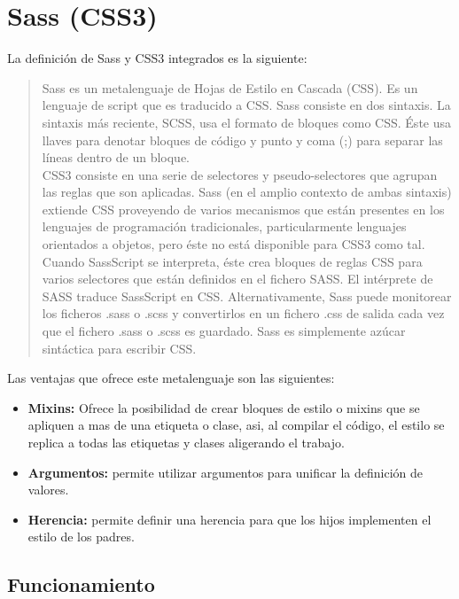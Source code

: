 
\section{Sass (CSS3)}
La definición de Sass y CSS3 integrados es la siguiente:

\begin{quote}
	Sass es un metalenguaje de Hojas de Estilo en Cascada (CSS). Es un lenguaje de script que es traducido a CSS. Sass consiste en dos sintaxis. La sintaxis más reciente, SCSS, usa el formato de bloques como CSS. Éste usa llaves para denotar bloques de código y punto y coma (;) para separar las líneas dentro de un bloque.\\
	
	CSS3 consiste en una serie de selectores y pseudo-selectores que agrupan las reglas que son aplicadas. Sass (en el amplio contexto de ambas sintaxis) extiende CSS proveyendo de varios mecanismos que están presentes en los lenguajes de programación tradicionales, particularmente lenguajes orientados a objetos, pero éste no está disponible para CSS3 como tal. Cuando SassScript se interpreta, éste crea bloques de reglas CSS para varios selectores que están definidos en el fichero SASS. El intérprete de SASS traduce SassScript en CSS. Alternativamente, Sass puede monitorear los ficheros .sass o .scss y convertirlos en un fichero .css de salida cada vez que el fichero .sass o .scss es guardado. Sass es simplemente azúcar sintáctica para escribir CSS.
\end{quote}

Las ventajas que ofrece este metalenguaje son las siguientes:

\begin{itemize}
	\item \textbf{Mixins:} Ofrece la posibilidad de crear bloques de estilo o mixins que se apliquen a mas de una etiqueta o clase, asi, al compilar el código, el estilo se replica a todas las etiquetas y clases aligerando el trabajo.
	\item \textbf{Argumentos:} permite utilizar argumentos para unificar la definición de valores.
	\item \textbf{Herencia:} permite definir una herencia para que los hijos implementen el estilo de los padres. 
\end{itemize}

\subsection{Funcionamiento}


